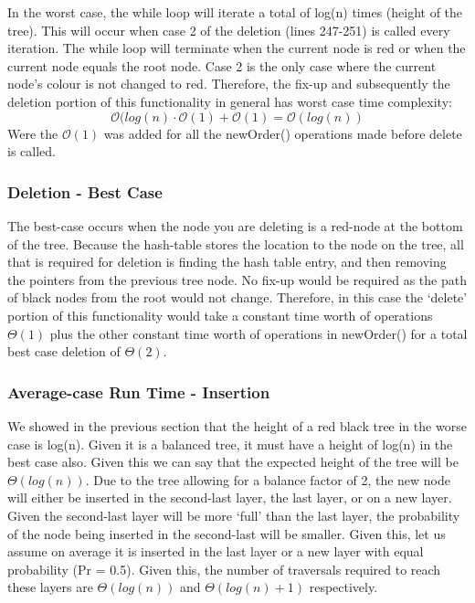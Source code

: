 \documentclass[11p]{article}
\def\bb{\bigbreak}
\begin{document}
In the worst case, the while loop will iterate a total of log(n) times (height of the tree). This will occur when case 2 of the deletion (lines 247-251) is called every iteration. The while loop will terminate when the current node is red or when the current node equals the root node. Case 2 is the only case where the current node's colour is not changed to red. Therefore, the fix-up and subsequently the deletion portion of this functionality in general has worst case time complexity:
$$\mathcal{O}(log(n)\cdot \mathcal{O}(1) + \mathcal{O}(1)= \mathcal{O}(log(n))$$
Were the $\mathcal{O}(1)$ was added for all the newOrder() operations made before delete is called.
\subsubsection{Deletion - Best Case}
The best-case occurs when the node you are deleting is a red-node at the bottom of the tree. Because the hash-table stores the location to the node on the tree, all that is required for deletion is finding the hash table entry, and then removing the pointers from the previous tree node. No fix-up would be required as the path of black nodes from the root would not change. Therefore, in this case the `delete' portion of this functionality would take a constant time worth of operations $\Theta(1)$ plus the other constant time worth of operations in newOrder() for a total best case deletion of $\Theta(2)$.



\subsubsection{Average-case Run Time - Insertion}
We showed in the previous section that the height of a red black tree in the worse case is log(n). Given it is a balanced tree, it must have a height of log(n) in the best case also. Given this we can say that the expected height of the tree will be $\Theta(log(n))$. Due to the tree allowing for a balance factor of 2, the new node will either be inserted in the second-last layer, the last layer, or on a new layer. Given the second-last layer will be more `full' than the last layer, the probability of the node being inserted in the second-last will be smaller. Given this, let us assume on average it is inserted in the last layer or a new layer with equal probability (Pr = 0.5). Given this, the number of traversals required to reach these layers are $\Theta(log(n))$ and $\Theta(log(n) + 1)$ respectively. \bb
\end{document}
